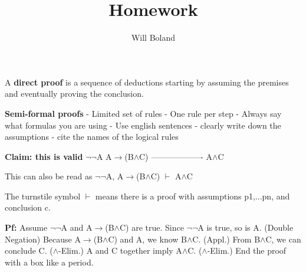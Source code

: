 \documentclass{article}
\begin{document}
\title{Homework}
\author{Will Boland}
\maketitle

A \textbf{direct proof } is a sequence of deductions starting by assuming the premises and eventually proving the conclusion.\newline\newline

\textbf{Semi-formal proofs}\newline
- Limited set of rules\newline
- One rule per step\newline
- Always say what formulas you are using\newline
- Use english sentences\newline
- clearly write down the assumptions\newline
- cite the names of the logical rules \newline\newline

\textbf{Claim: this is valid}\newline
$\neg$$\neg$A\newline
A$\rightarrow$(B$\wedge$C)\newline
-------------------\newline
A$\wedge$C\newline\newline

This can also be read as $\neg$$\neg$A, A$\rightarrow$(B$\wedge$C) $\vdash$ A$\wedge$C\newline\newline

The turnstile symbol $\vdash$ means there is a proof with assumptions p1,...pn, and conclusion c.\newline\newline

\textbf{Pf:}\newline
Assume $\neg$$\neg$A and A$\rightarrow$(B$\wedge$C) are true.\newline
Since $\neg$$\neg$A is true, so is A. (Double Negation)\newline
Because A$\rightarrow$(B$\wedge$C) and A, we know B$\wedge$C. (Appl.)\newline
From B$\wedge$C, we can conclude C. ($\wedge$-Elim.)\newline
A and C together imply A$\wedge$C. ($\wedge$-Elim.) End the proof with a box like a period.\newline\newline
\end{document}
